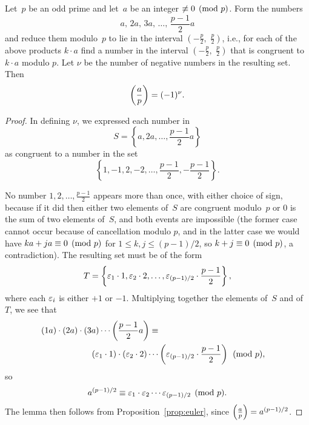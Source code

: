 \begin{lemma}\label{lem:gauss}
Let~$p$ be an odd prime and let~$a$ be an integer $\not\equiv 0\pmod{p}$.
 Form the numbers
$$
a,\, 2a,\, 3a,\, \ldots,\, \frac{p-1}{2} a
$$
and reduce them modulo~$p$ to lie in the interval $(-\frac{p}{2},\,\,
\frac{p}{2})$, i.e., for each of the above products $k\cdot a$ find a number
in the interval $(-\frac{p}{2},\,\, \frac{p}{2})$ that is congruent to
$k\cdot a$ modulo $p$.  Let $\nu$ be the number of negative numbers in the
resulting set.  Then
$$
\left(\frac{a}{p}\right) = (-1)^{\nu}.
$$
\end{lemma}
\begin{proof}
In defining $\nu$, we expressed each number in
$$
S = \left\{a, 2a, \ldots, \frac{p-1}{2} a\right\}
$$
as congruent to a number in the set
$$
\left\{ 1, -1, 2, -2, \ldots, \frac{p-1}{2}, -\frac{p-1}{2}\right\}.
$$

No number $1, 2, \ldots, \frac{p-1}{2}$ appears more than once, with
either choice of sign, because if it did then either two elements
of~$S$ are congruent modulo~$p$ or $0$ is the sum of two elements
of~$S$, and both events are impossible (the former case cannot occur
because of cancellation modulo $p$, and in the latter case we would
have $ka + ja \equiv 0 \pmod{p}$ for $1\leq k,j \leq (p-1)/2$, so
$k+j\equiv 0\pmod{p}$, a contradiction).  The resulting set must
be of the form
$$
T = \left\{\varepsilon_1\cdot 1, \varepsilon_2 \cdot 2, \ldots, \varepsilon_{(p-1)/2}\cdot \frac{p-1}{2} \right\},
$$
where each $\varepsilon_i$ is either $+1$ or $-1$.  Multiplying together the elements of~$S$ and of~$T$, we see that
\begin{align*}
   (1a) \cdot (2a)\cdot(3a) \cdots \left(\frac{p-1}{2} a\right)
        \equiv \\
   (\varepsilon_1\cdot 1)\cdot (\varepsilon_2 \cdot 2) \cdots & \left(\varepsilon_{(p-1)/2} \cdot \frac{p-1}{2}\right)\pmod{p},
\end{align*}
so
$$
a^{(p-1)/2} \equiv \varepsilon_1\cdot \varepsilon_2 \cdots \varepsilon_{(p-1)/2}\pmod{p}.
$$
The lemma then follows from Proposition~\ref{prop:euler}, since $\left(\frac{a}{p}\right) = a^{(p-1)/2}$.
\end{proof}

